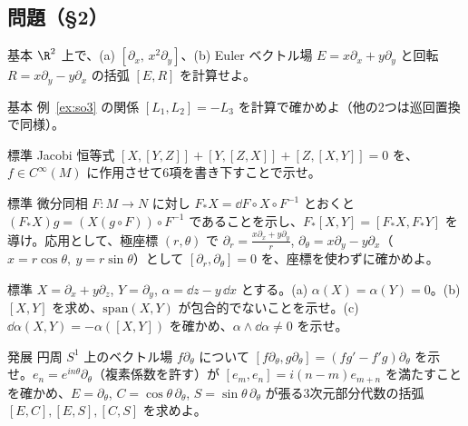 \subsection*{問題（§2）}
\begin{prob}{基本}\label{p:bracketcalc}
$\R^2$ 上で、(a) $[\partial_x,\,x^2\partial_y]$、(b) Euler ベクトル場 $E=x\partial_x+y\partial_y$ と回転 $R=x\partial_y-y\partial_x$ の括弧 $[E,R]$ を計算せよ。
\end{prob}
\begin{prob}{基本}\label{p:so3}
例~\ref{ex:so3} の関係 $[L_1,L_2]=-L_3$ を計算で確かめよ（他の2つは巡回置換で同様）。
\end{prob}
\begin{prob}{標準}\label{p:jacobi}
Jacobi 恒等式 $[X,[Y,Z]]+[Y,[Z,X]]+[Z,[X,Y]]=0$ を、$f\in C^\infty(M)$ に作用させて6項を書き下すことで示せ。
\end{prob}
\begin{prob}{標準}\label{p:natural}
微分同相 $F:M\to N$ に対し $F_*X=\dd F\circ X\circ F^{-1}$ とおくと $(F_*X)g=(X(g\circ F))\circ F^{-1}$ であることを示し、$F_*[X,Y]=[F_*X,F_*Y]$ を導け。応用として、極座標 $(r,\theta)$ で $\partial_r=\frac{x\partial_x+y\partial_y}{r}$, $\partial_\theta=x\partial_y-y\partial_x$（$x=r\cos\theta,\ y=r\sin\theta$）として $[\partial_r,\partial_\theta]=0$ を、座標を使わずに確かめよ。
\end{prob}
\begin{prob}{標準}\label{p:contact}
$X=\partial_x+y\partial_z$, $Y=\partial_y$, $\alpha=\dd z-y\,\dd x$ とする。(a) $\alpha(X)=\alpha(Y)=0$。(b) $[X,Y]$ を求め、$\mathrm{span}(X,Y)$ が包合的でないことを示せ。(c) $\dd\alpha(X,Y)=-\alpha([X,Y])$ を確かめ、$\alpha\wedge\dd\alpha\ne0$ を示せ。
\end{prob}
\begin{prob}{発展}\label{p:witt}
円周 $S^1$ 上のベクトル場 $f\partial_\theta$ について $[f\partial_\theta,g\partial_\theta]=(fg'-f'g)\partial_\theta$ を示せ。$e_n=e^{in\theta}\partial_\theta$（複素係数を許す）が $[e_m,e_n]=i(n-m)e_{m+n}$ を満たすことを確かめ、$E=\partial_\theta$, $C=\cos\theta\,\partial_\theta$, $S=\sin\theta\,\partial_\theta$ が張る3次元部分代数の括弧 $[E,C],[E,S],[C,S]$ を求めよ。
\end{prob}
